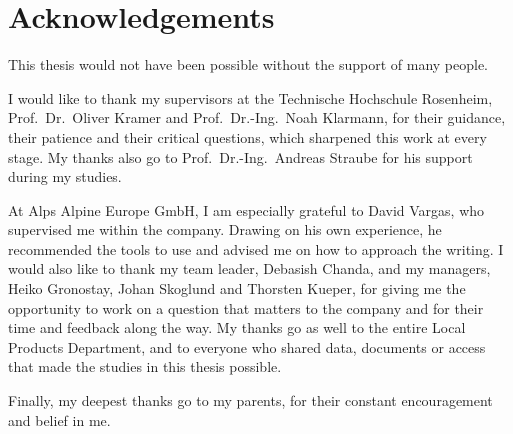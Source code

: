 \chapter*{Acknowledgements}

This thesis would not have been possible without the support of many people.

I would like to thank my supervisors at the Technische Hochschule Rosenheim,
Prof.\ Dr.\ Oliver Kramer and Prof.\ Dr.-Ing.\ Noah Klarmann, for their guidance,
their patience and their critical questions, which sharpened this work at every
stage. My thanks also go to Prof.\ Dr.-Ing.\ Andreas Straube for his support during
my studies.

At Alps Alpine Europe GmbH, I am especially grateful to David Vargas, who supervised
me within the company. Drawing on his own experience, he recommended the tools to use
and advised me on how to approach the writing. I would also like to thank my team
leader, Debasish Chanda, and my managers, Heiko Gronostay, Johan Skoglund and
Thorsten Kueper, for giving me the opportunity to work on a question that matters to
the company and for their time and feedback along the way. My thanks go as well to
the entire Local Products Department, and to everyone who shared data, documents or
access that made the studies in this thesis possible.

Finally, my deepest thanks go to my parents, for their constant encouragement and
belief in me.
